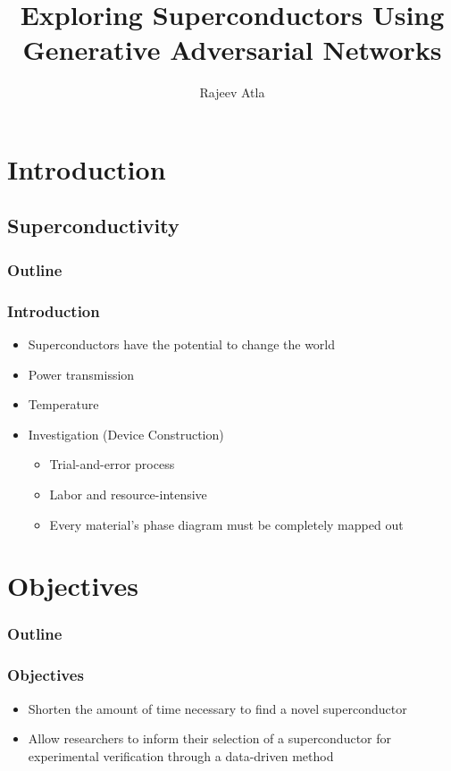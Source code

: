 \documentclass[12pt]{beamer}
\title{Exploring Superconductors Using Generative Adversarial Networks}
\author[Rajeev Atla]
{Rajeev Atla}
\institute[JPS]
{
  John P. Stevens High School
}
\begin{document}
\frame{\titlepage}



\section{Introduction}
\subsection{Superconductivity}

\begin{frame}
\frametitle{Outline}
\tableofcontents[currentsection]
\end{frame}



\begin{frame}
\frametitle{Introduction}
\begin{itemize}
  \pause
  \item Superconductors have the potential to change the world
  \pause
  \item Power transmission
  \pause
  \item Temperature
  \pause
  \item Investigation (Device Construction)
  \pause
  \begin{itemize}
      \item Trial-and-error process
      \pause
      \item Labor and resource-intensive
      \pause
      \item Every material's phase diagram must be completely mapped out
  \end{itemize}
\end{itemize}
\end{frame}





\section{Objectives}
\begin{frame}
\frametitle{Outline}
\tableofcontents[currentsection]
\end{frame}

\begin{frame}
\frametitle{Objectives}

\begin{itemize}
    \item Shorten the amount of time necessary to find a novel superconductor
    \pause
    \item Allow researchers to inform their selection of a superconductor for experimental verification through a data-driven method
\end{itemize}

\end{frame}
\end{document}
